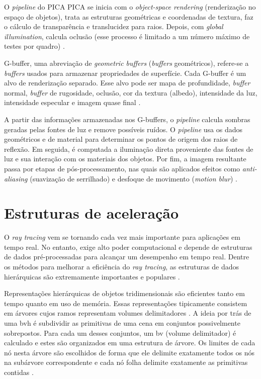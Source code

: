 O \textit{pipeline} do PICA PICA se inicia com o \textit{object-space rendering} (renderização no espaço de objetos), trata as estruturas geométricas e coordenadas de textura, faz o cálculo de transparência e translucidez para raios. Depois, com \textit{global illumination}, calcula oclusão (esse processo é limitado a um número máximo de testes por quadro) \cite{barre2019hybrid}.

G-buffer, uma abreviação de \textit{geometric buffers} (\textit{buffers} geométricos), refere-se a \textit{buffers} usados para armazenar propriedades de superfície. Cada G-buffer é um alvo de renderização separado. Esse alvo pode ser mapa de profundidade, \textit{buffer} normal, \textit{buffer} de rugosidade, oclusão, cor da textura (albedo), intensidade da luz, intensidade especular e imagem quase final \cite{akenine2019real}.

A partir das informações armazenadas nos G-buffers, o \textit{pipeline} calcula sombras geradas pelas fontes de luz e remove possíveis ruídos. O \textit{pipeline} usa os dados geométricos e de material para determinar os pontos de origem dos raios de reflexão. Em seguida, é computada a iluminação direta proveniente das fontes de luz e sua interação com os materiais dos objetos. Por fim, a imagem resultante passa por etapas de pós-processamento, nas quais são aplicados efeitos como \textit{anti-aliasing} (suavização de serrilhado) e desfoque de movimento (\textit{motion blur}) \cite{barre2019hybrid}.



\section{Estruturas de aceleração}

O \textit{ray tracing} vem se tornando cada vez mais importante para aplicações em tempo real. No entanto, exige alto poder computacional e depende de estruturas de dados pré-processadas para alcançar um desempenho em tempo real. Dentre os métodos para melhorar a eficiência do \textit{ray tracing}, as estruturas de dados hierárquicas são extremamente importantes e populares \cite{stich2009spatial}.

Representações hierárquicas de objetos tridimensionais são eficientes tanto em tempo quanto em uso de memória. Essas representações tipicamente consistem em árvores cujos ramos representam volumes delimitadores \cite{rubin19803}. A ideia por trás de uma \gls{bvh} é subdividir as primitivas de uma cena em conjuntos possivelmente sobrepostos. Para cada um desses conjuntos, um \gls{bv} (volume delimitador) é calculado e estes são organizados em uma estrutura de árvore. Os limites de cada nó nesta árvore são escolhidos de forma que ele delimite exatamente todos os nós na subárvore correspondente e cada nó folha delimite exatamente as primitivas contidas \cite{pantaleoni2010hlbvh}.


